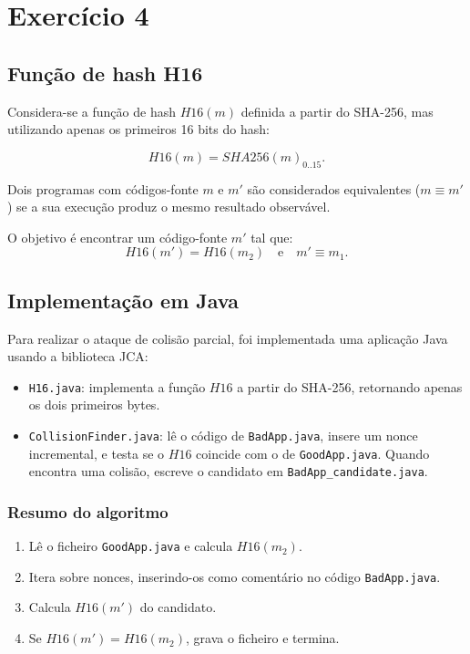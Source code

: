 \chapter{Exercício 4}
\label{cha:exercise_4}

\section{Função de hash H16}

Considera-se a função de hash \(H16(m)\) definida a partir do SHA-256, mas utilizando apenas os primeiros 16 bits do hash:

\[
H16(m) = SHA256(m)_{0..15}.
\]

Dois programas com códigos-fonte \(m\) e \(m'\) são considerados equivalentes (\(m \equiv m'\)) se a sua execução produz o mesmo resultado observável.

O objetivo é encontrar um código-fonte \(m'\) tal que:
\[
H16(m') = H16(m_2) \quad \text{e} \quad m' \equiv m_1.
\]

\section{Implementação em Java}

Para realizar o ataque de colisão parcial, foi implementada uma aplicação Java usando a biblioteca JCA:

\begin{itemize}
    \item \texttt{H16.java}: implementa a função \(H16\) a partir do SHA-256, retornando apenas os dois primeiros bytes.
    \item \texttt{CollisionFinder.java}: lê o código de \texttt{BadApp.java}, insere um nonce incremental, e testa se o \(H16\) coincide com o de \texttt{GoodApp.java}. Quando encontra uma colisão, escreve o candidato em \texttt{BadApp\_candidate.java}.
\end{itemize}

\subsection*{Resumo do algoritmo}

\begin{enumerate}
    \item Lê o ficheiro \texttt{GoodApp.java} e calcula \(H16(m_2)\).
    \item Itera sobre nonces, inserindo-os como comentário no código \texttt{BadApp.java}.
    \item Calcula \(H16(m')\) do candidato.
    \item Se \(H16(m') = H16(m_2)\), grava o ficheiro e termina.
\end{enumerate}

